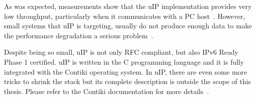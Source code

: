 As was expected, measurements show that the uIP implementation provides very low
throughput, particularly when it communicates with a PC host~\cite{thesis-towards}.
However, small systems that uIP is targeting, usually do not produce enough data
to make the performance degradation a serious problem~\cite{thesis-towards}.

Despite being so small, uIP is not only RFC compliant, but also IPv6 Ready Phase 1 certified.
uIP is written in the C programming language and it is fully integrated with the Contiki operating system.
In uIP, there are even some more tricks to shrink the stack
but its complete description is outside the scope of this thesis. %
Please refer to the Contiki documentation for more details~\cite{contiki-docs}.
